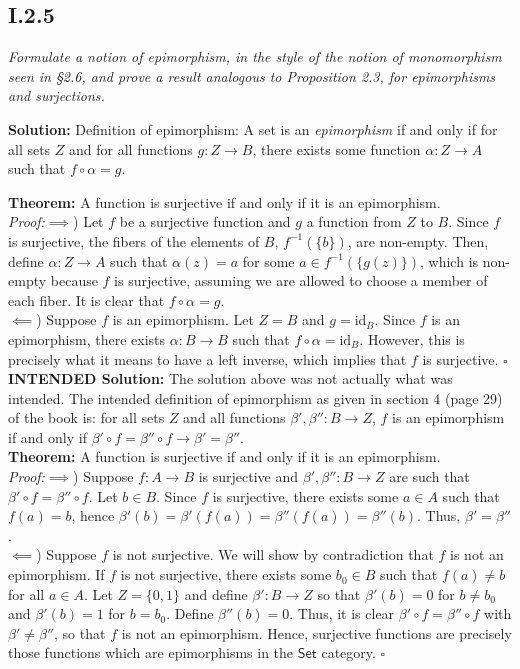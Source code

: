 \documentclass[11pt,a4paper]{article}
\begin{document}
\subsection*{I.2.5} \textit{Formulate a notion of epimorphism, in the style of the notion of monomorphism seen in \S 2.6, and prove a result analogous to Proposition 2.3, for epimorphisms and surjections.}

\noindent \textbf{Solution:} Definition of epimorphism:  A set is an \textit{epimorphism} if and only if for all sets $Z$ and for all functions $g: Z \rightarrow B$, there exists some function $\alpha: Z \rightarrow A$ such that $f \circ \alpha = g$.

\noindent \textbf{Theorem:} A function is surjective if and only if it is an epimorphism. \\
\noindent \textit{Proof:}$\implies$)  Let $f$ be a surjective function and $g$ a function from $Z$ to $B$.  Since $f$ is surjective, the fibers of the elements of $B$, $f^{-1}(\{b\})$, are non-empty.  Then, define $\alpha: Z \rightarrow A$ such that $\alpha(z) = a$ for some $a \in f^{-1}(\{g(z)\})$, which is non-empty because $f$ is surjective, assuming we are allowed to choose a member of each fiber.  It is clear that $f \circ \alpha = g$. \\
\noindent $\impliedby$) Suppose $f$ is an epimorphism.  Let $Z=B$ and $g = \text{id}_B$.  Since $f$ is an epimorphism, there exists $\alpha: B \rightarrow B$ such that $f \circ \alpha = \text{id}_B$.  However, this is precisely what it means to have a left inverse, which implies that $f$ is surjective. $\square$ \\

\noindent\textbf{INTENDED Solution:}  The solution above was not actually what was intended.  The intended definition of epimorphism as given in section 4 (page 29) of the book is: for all sets $Z$ and all functions $\beta',\beta'':B \rightarrow Z$, $f$ is an epimorphism if and only if $\beta' \circ f = \beta'' \circ f \rightarrow \beta' = \beta''$.\\
\noindent\textbf{Theorem:} A function is surjective if and only if it is an epimorphism.\\
\noindent\textit{Proof:}$\implies$) Suppose $f:A \rightarrow B$ is surjective and $\beta',\beta'':B \rightarrow Z$ are such that $\beta' \circ f =\beta'' \circ f$. Let $b \in B$.  Since $f$ is surjective, there exists some $a \in A$ such that $f(a)=b$, hence $\beta'(b) = \beta'(f(a)) = \beta''(f(a)) = \beta''(b)$.  Thus, $\beta' = \beta''$.\\
\noindent$\impliedby$) Suppose $f$ is not surjective.  We will show by contradiction that $f$ is not an epimorphism.  If $f$ is not surjective, there exists some $b_0 \in B$ such that $f(a) \neq b$ for all $a \in A$.  Let $Z  = \{0,1\}$ and define $\beta': B \rightarrow Z$ so that $\beta'(b) = 0$ for $b \neq b_0$ and $\beta'(b) = 1$ for $b = b_0$.  Define $\beta''(b) = 0$.  Thus, it is clear $\beta' \circ f = \beta'' \circ f$ with $\beta' \neq \beta''$, so that $f$ is not an epimorphism.  Hence, surjective functions are precisely those functions which are epimorphisms in the $\textsf{Set}$ category. $\square$
\end{document}
